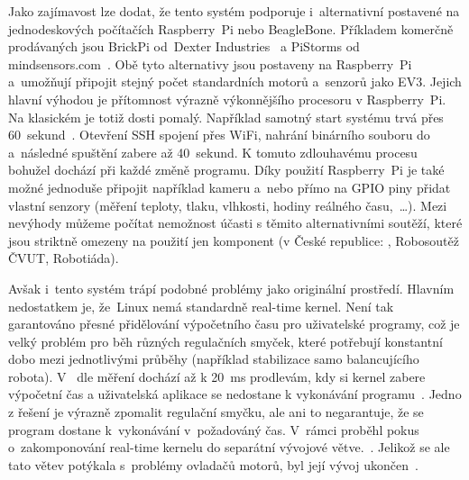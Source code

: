 Jako zajímavost lze dodat, že tento systém podporuje i~alternativní  postavené na jednodeskových počítačích Raspberry~Pi nebo BeagleBone. Příkladem komerčně prodávaných  jsou BrickPi od~Dexter Industries~\cite{lego_dexterindustries_brickpi} a PiStorms od mindsensors.com~\cite{lego_mindsensor_pistorms}.
Obě tyto alternativy jsou postaveny na Raspberry~Pi a~umožňují připojit stejný počet standardních \lego{} motorů a~senzorů jako EV3.
Jejich hlavní výhodou je přítomnost výrazně výkonnějšího procesoru v Raspberry~Pi. Na klasickém  je totiž \evThreeDev{} dosti pomalý. 
Například samotný start systému trvá přes 60~sekund~\cite{legoMindstormsEV3_ev3dev_video-system-boot}. 
Otevření SSH spojení přes WiFi, nahrání binárního souboru do  a~následné spuštění zabere až 40~sekund. 
K tomuto zdlouhavému procesu bohužel dochází při každé změně programu. 
Díky použití Raspberry~Pi je také možné jednoduše připojit například kameru a~nebo přímo na GPIO piny přidat vlastní senzory (měření teploty, tlaku, vlhkosti, hodiny reálného času,~\dots).  
Mezi nevýhody můžeme počítat nemožnost účasti s těmito alternativními  soutěží, které jsou striktně omezeny na použití jen \lego{} komponent (v České republice: \fll{}, Robosoutěž ČVUT, Robotiáda).

Avšak i~tento systém trápí podobné problémy jako originální \lego{} prostředí. 
Hlavním nedostatkem je, že~Linux nemá standardně real-time kernel. 
Není tak garantováno přesné přidělování výpočetního času pro uživatelské programy, což je velký problém pro běh různých regulačních smyček, které potřebují konstantní dobo mezi jednotlivými průběhy (například stabilizace samo balancujícího robota). 
V~\evThreeDev{} dle měření dochází až k 20~ms prodlevám, kdy si kernel zabere výpočetní čas a uživatelská aplikace se nedostane k vykonávání programu~\cite{legoMindstormsEV3_ev3dev-issue_constant-loop-time}. 
Jedno z řešení je výrazně zpomalit regulační smyčku, ale ani to negarantuje, že se program dostane k~vykonávání v~požadováný čas.
V~rámci \evThreeDev{} proběhl pokus o~zakomponování real-time kernelu do separátní vývojové větve.~\cite{legoMindstormsEV3_ev3dev-rt-kernel-start}. 
Jelikož se ale tato větev potýkala s~problémy ovladačů motorů, byl její vývoj ukončen~\cite{legoMindstormsEV3_ev3dev-rt-kernel-end}.  

